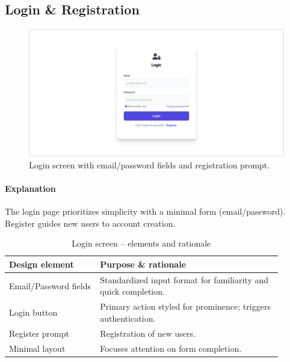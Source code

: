 \documentclass[11pt,a4paper]{article}
\begin{document}

	\subsection{Login \& Registration}\label{subsec:login-register}

	\begin{figure}[H]
		\centering
		\includegraphics[width=1.0\linewidth]{pictures/main/LoginPage_Figma.png}%
		\caption{Login screen with email/password fields and registration prompt.}
		\label{fig:ui-login}
	\end{figure}

	\paragraph{Explanation}%
	The login page prioritizes simplicity with a minimal form (email/password).
	Register guides new users to account creation. 
	\begin{table}[H]
		\centering
		\caption{Login screen – elements and rationale}
		\label{tab:login-elements}
		\begin{tabular}{p{0.30\linewidth} p{0.60\linewidth}}
			\toprule
			\textbf{Design element} & \textbf{Purpose \& rationale} \\ \midrule
			Email/Password fields   & Standardized input format for familiarity and quick completion. \\
			Login button       & Primary action styled for prominence; triggers authentication. \\
			Register prompt        & Registration of new users. \\
			Minimal layout         & Focuses attention on form completion. \\
			\bottomrule
		\end{tabular}
	\end{table}
\end{document}
